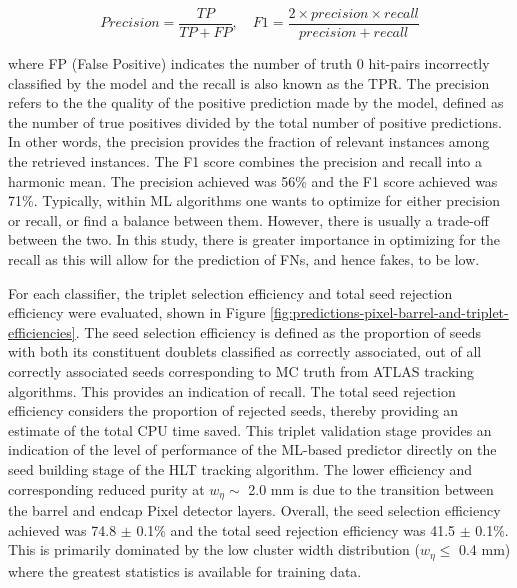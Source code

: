 \begin{equation}
    Precision = \frac{TP}{TP + FP}, \quad F1 = \frac{2 \times precision \times recall}{precision + recall}
\end{equation}

where FP (False Positive) indicates the number of truth 0 hit-pairs incorrectly classified by the model and the recall is also known as the TPR. The precision refers to the the quality of the positive prediction made by the model, defined as the number of true positives divided by the total number of positive predictions. In other words, the precision provides the fraction of relevant instances among the retrieved instances. The F1 score combines the precision and recall into a harmonic mean. The precision achieved was 56\% and the F1 score achieved was 71\%. Typically, within ML algorithms one wants to optimize for either precision or recall, or find a balance between them. However, there is usually a trade-off between the two. In this study, there is greater importance in optimizing for the recall as this will allow for the prediction of FNs, and hence fakes, to be low.


For each classifier, the triplet selection efficiency and total seed rejection efficiency were evaluated, shown in Figure \ref{fig:predictions-pixel-barrel-and-triplet-efficiencies}. The seed selection efficiency is defined as the proportion of seeds with both its constituent doublets classified as correctly associated, out of all correctly associated seeds corresponding to MC truth from ATLAS tracking algorithms. This provides an indication of recall. The total seed rejection efficiency considers the proportion of rejected seeds, thereby providing an estimate of the total CPU time saved. This triplet validation stage provides an indication of the level of performance of the ML-based predictor directly on the seed building stage of the HLT tracking algorithm. The lower efficiency and corresponding reduced purity at $w_{\eta} \sim$ 2.0 mm is due to the transition between the barrel and endcap Pixel detector layers. Overall, the seed selection efficiency achieved was 74.8 $\pm$ 0.1\% and the total seed rejection efficiency was 41.5 $\pm$ 0.1\%. This is primarily dominated by the low cluster width distribution ($w_{\eta} \leq$ 0.4 mm) where the greatest statistics is available for training data.





